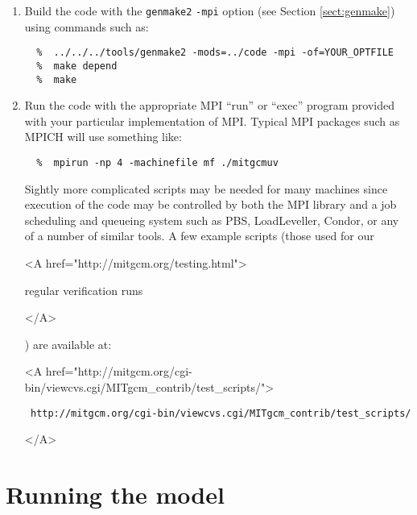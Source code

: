 \begin{enumerate}
\begin{itemize}
  \item \begin{rawhtml} <A
      href="http://www.osc.edu/~pw/mpiexec/">
    \end{rawhtml}
    MPIexec
    \begin{rawhtml} </A> \end{rawhtml}
  \end{itemize}
  
\item Build the code with the \texttt{genmake2} \texttt{-mpi} option
  (see Section \ref{sect:genmake}) using commands such as:
{\footnotesize \begin{verbatim}
  %  ../../../tools/genmake2 -mods=../code -mpi -of=YOUR_OPTFILE
  %  make depend
  %  make
\end{verbatim} }
  
\item Run the code with the appropriate MPI ``run'' or ``exec''
  program provided with your particular implementation of MPI.
  Typical MPI packages such as MPICH will use something like:
\begin{verbatim}
  %  mpirun -np 4 -machinefile mf ./mitgcmuv
\end{verbatim}
  Sightly more complicated scripts may be needed for many machines
  since execution of the code may be controlled by both the MPI
  library and a job scheduling and queueing system such as PBS,
  LoadLeveller, Condor, or any of a number of similar tools.  A few
  example scripts (those used for our \begin{rawhtml} <A
    href="http://mitgcm.org/testing.html"> \end{rawhtml}regular
  verification runs\begin{rawhtml} </A> \end{rawhtml}) are available
  at:
  \begin{rawhtml} <A
    href="http://mitgcm.org/cgi-bin/viewcvs.cgi/MITgcm_contrib/test_scripts/">
  \end{rawhtml}
  {\footnotesize \tt
    http://mitgcm.org/cgi-bin/viewcvs.cgi/MITgcm\_contrib/test\_scripts/ }
  \begin{rawhtml} </A> \end{rawhtml}

\end{enumerate}



\section{Running the model}
\label{sect:runModel}

